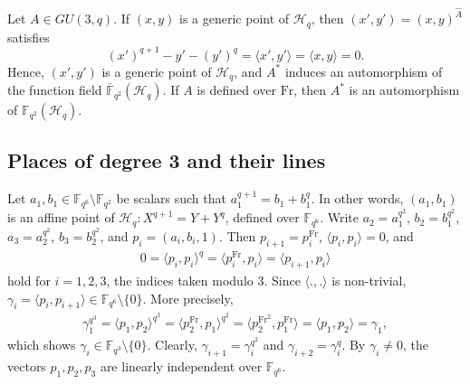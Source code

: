 \documentclass[a4paper]{amsart}
\theoremstyle{plain}
\theoremstyle{definition}
\theoremstyle{remark}
\newcommand{\Frob}{\mathrm{Fr}}
\begin{document}
Let $A\in GU(3,q)$. If $(x,y)$ is a generic point of $\mathscr{H}_q$, then $(x',y')=(x,y)^{\hat{A}}$ satisfies 
\[(x')^{q+1}-y'-(y')^q=\langle x',y' \rangle = \langle x,y \rangle=0. \]
Hence, $(x',y')$ is a generic point of $\mathscr{H}_q$, and $A^*$ induces an automorphism of the function field $\bar{\mathbb{F}}_{q^2}(\mathscr{H}_q)$. If $A$ is defined over $\Frob$, then $A^*$ is an automorphism of $\mathbb{F}_{q^2}(\mathscr{H}_q)$. 



\subsection{Places of degree 3 and their lines}
Let $a_1,b_1 \in \mathbb{F}_{q^6}\setminus \mathbb{F}_{q^2}$ be scalars such that $a_1^{q+1}=b_1+b_1^q$. In other words, $(a_1,b_1)$ is an affine point of $\mathscr{H}_q:X^{q+1}=Y+Y^q$, defined over $\mathbb{F}_{q^6}$. Write $a_2=a_1^{q^2}$, $b_2=b_1^{q^2}$, $a_3=a_2^{q^2}$, $b_3=b_2^{q^2}$, and $p_i=(a_i,b_i,1)$. Then $p_{i+1}=p_i^\Frob$, $\langle p_i,p_i \rangle = 0$, and 
\begin{align*} %
0=\langle p_i,p_i \rangle ^q = \langle p_i^\Frob,p_i \rangle = \langle p_{i+1},p_i \rangle
\end{align*}
hold for $i=1,2,3$, the indices taken modulo $3$. Since $\langle .,. \rangle$ is non-trivial, $\gamma_i = \langle p_i,p_{i+1} \rangle \in \mathbb{F}_{q^6}\setminus \{0\}$. More precisely,
\begin{align*} %
\gamma_1^{q^3}=\langle p_1,p_{2} \rangle^{q^3} = \langle p_2^\Frob,p_{1} \rangle^{q^2} = \langle p_2^{\Frob^2},p_{1}^\Frob \rangle = \langle p_1,p_2 \rangle = \gamma_1,
\end{align*}
which shows $\gamma_i \in \mathbb{F}_{q^3}\setminus \{0\}$. Clearly, $\gamma_{i+1} = \gamma_i^{q^2}$ and $\gamma_{i+2} = \gamma_i^{q}$. By $\gamma_i\neq 0$, the vectors $p_1,p_2,p_3$ are linearly independent over $\mathbb{F}_{q^6}$. 
\end{document}
